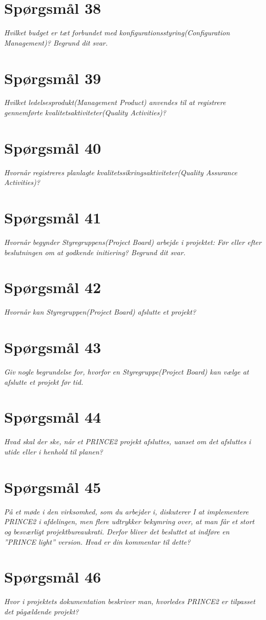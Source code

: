 \section{Spørgsmål 38}
\textit{Hvilket budget er tæt forbundet med konfigurationsstyring(Configuration Management)? Begrund dit svar.}
\section{Spørgsmål 39}
\textit{Hvilket ledelsesprodukt(Management Product) anvendes til at registrere gennemførte kvalitetsaktiviteter(Quality Activities)?}
\section{Spørgsmål 40}
\textit{Hvornår registreres planlagte kvalitetssikringsaktiviteter(Quality Assurance Activities)?}
\section{Spørgsmål 41}
\textit{Hvornår begynder Styregruppens(Project Board) arbejde i projektet: Før eller efter beslutningen om at godkende initiering? Begrund dit svar.}
\section{Spørgsmål 42}
\textit{Hvornår kan Styregruppen(Project Board) afslutte et projekt?}
\section{Spørgsmål 43}
\textit{Giv nogle begrundelse for, hvorfor en Styregruppe(Project Board) kan vælge at afslutte et projekt før tid.}
\section{Spørgsmål 44}
\textit{Hvad skal der ske, når et PRINCE2 projekt afsluttes, uanset om det afsluttes i utide eller i henhold til planen?}
\section{Spørgsmål 45}
\textit{På et møde i den virksomhed, som du arbejder i, diskuterer I at implementere PRINCE2 i afdelingen, men flere udtrykker bekymring over, at man får et stort og besværligt projektbureaukrati. Derfor bliver det besluttet at indføre en ”PRINCE light” version. Hvad er din kommentar til dette?}
\section{Spørgsmål 46}
\textit{Hvor i projektets dokumentation beskriver man, hvorledes PRINCE2 er tilpasset det pågældende projekt?}
